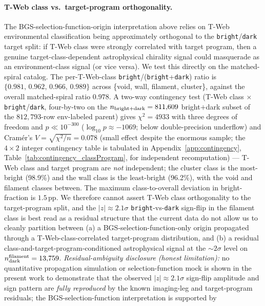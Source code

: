\documentclass[aps,prd,twocolumn,superscriptaddress,showpacs,preprintnumbers,nofootinbib,longbibliography,floatfix]{revtex4-2}
\begin{document}
\paragraph{T-Web class vs.\ target-program orthogonality.} The BGS-selection-function-origin interpretation
above relies on T-Web environmental classification being approximately
orthogonal to the \texttt{bright}/\texttt{dark} target split: if
T-Web class were strongly correlated with target program, then a
genuine target-class-dependent astrophysical chirality signal could
masquerade as an environment-class signal (or vice versa). We test
this directly on the matched-spiral catalog. The per-T-Web-class
\texttt{bright}/(\texttt{bright}+\texttt{dark}) ratio is
$\{0.981,\,0.962,\,0.966,\,0.989\}$ across
\{void, wall, filament, cluster\}, against the overall
matched-spiral ratio $0.978$. A two-way contingency test
(T-Web class $\times$ \texttt{bright}/\texttt{dark}, four-by-two
on the $n_{\rm bright+dark} = 811{,}609$ bright$+$dark subset of the
$812{,}793$-row env-labeled parent) gives
$\chi^{2} = 4933$ with three degrees of freedom and
$p \ll 10^{-300}$ ($\log_{10} p \approx -1069$; below double-precision
underflow) and Cram\'er's $V = \sqrt{\chi^2/n} = 0.078$ (small
effect despite the enormous sample; the $4{\times}2$ integer
contingency table is tabulated in Appendix~\ref{app:contingency},
Table~\ref{tab:contingency_classProgram}, for independent
recomputation) ---
T-Web class and target program are \emph{not} independent;
the cluster class is the most-bright (98.9\%) and the wall class is the
least-bright (96.2\%), with the void and filament classes between.
The maximum class-to-overall deviation in bright-fraction is $1.5$\,pp.
We therefore cannot assert
T-Web class orthogonality to the target-program split, and
the $|z|\!\approx\!2.1\sigma$ \texttt{bright}-vs-\texttt{dark} sign-flip
in the filament class
is best read as a residual structure that the current data do
not allow us to cleanly partition between
(a) a BGS-selection-function-only origin propagated through a
T-Web-class-correlated target-program distribution, and
(b) a residual class-and-target-program-conditioned astrophysical
signal at the $\sim\!2\sigma$ level on $n_{\rm dark}^{\rm filament}
= 13{,}759$.
\emph{Residual-ambiguity disclosure (honest limitation):} no
quantitative propagation simulation or selection-function mock is
shown in the present work to demonstrate that the observed
$|z|\!\approx\!2.1\sigma$ sign-flip amplitude and sign pattern are
\emph{fully reproduced} by the known imaging-leg and target-program
residuals; the BGS-selection-function interpretation is supported by
\end{document}
